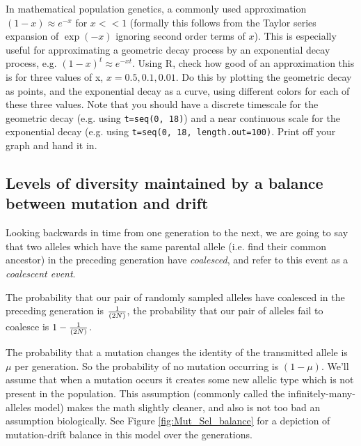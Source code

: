 \begin{question} \label{geo_question} In mathematical population genetics, a
  commonly used approximation $(1-x) \approx e^{-x}$ for $x << 1$ (formally
  this follows from the Taylor series expansion of $\exp(-x)$ ignoring second
  order terms of $x$).  This is especially useful for approximating a geometric
  decay process by an exponential decay process, e.g. $(1 - x)^t \approx
  e^{-xt}$. Using R, check how good of an approximation this is for three
  values of x, $x = 0.5, 0.1, 0.01$. Do this by plotting the geometric decay as
  points, and the exponential decay as a curve, using different colors for each
  of these three values. Note that you should have a discrete timescale for the
  geometric decay (e.g. using \texttt{t=seq(0, 18)}) and a near continuous scale
  for the exponential decay (e.g. using \texttt{t=seq(0, 18, length.out=100)}.
  Print off your graph and hand it in. 


\end{question}

\subsection{Levels of diversity maintained by a balance between
 mutation and drift} \label{DriftMutationBalance}

Looking backwards in time from one generation to the next, we are going to say
that two alleles which have the same parental allele (i.e. find their common
ancestor) in the preceding generation have \emph{coalesced}, and refer to this
event as a \emph{coalescent event}.

The probability that our pair of randomly sampled alleles have coalesced in the
preceding generation is $\nicefrac{1}{(2N)}$, the probability that our pair of
alleles fail to coalesce is $1-\nicefrac{1}{(2N)}$. 

The probability that a mutation changes the identity of the
transmitted allele is $\mu$ per generation. So the probability of no
mutation occurring is $(1-\mu)$. We'll assume that when a mutation
occurs it creates some new allelic type which is not present in the
population. This assumption (commonly called the infinitely-many-alleles model) makes the math slightly cleaner, and also
is not too bad an assumption biologically. See Figure
\ref{fig:Mut_Sel_balance} for a depiction of mutation-drift balance in
this model over the generations.

